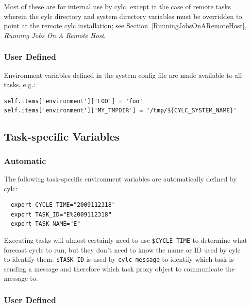 \documentclass[11pt,a4paper]{article}
\begin{document}
Most of these are for internal use by cylc, except in the case of remote
tasks wherein the cylc directory and system directory variables must be
overridden to point at the remote cylc installation; see
Section~\ref{RunningJobsOnARemoteHost}, {\em Running
Jobs On A Remote Host}. 

\subsubsection{User Defined}
\label{SystemWideVariables}

Environment variables defined in the system config file are made
available to all tasks, e.g.: 

\lstset{language=Python}

\begin{lstlisting}
self.items['environment']['FOO'] = 'foo'
self.items['environment']['MY_TMPDIR'] = '/tmp/${CYLC_SYSTEM_NAME}'
\end{lstlisting}


\subsection{Task-specific Variables}
\lstset{language=bash}

\subsubsection{Automatic}

The following task-specific environment variables are automatically
defined by cylc:

\begin{lstlisting}
  export CYCLE_TIME="2009112318"
  export TASK_ID="E%2009112318"
  export TASK_NAME="E"
\end{lstlisting}

Executing tasks will almost certainly need to use
\lstinline=$CYCLE_TIME= to determine what forecast cycle to run,
but they don't need to know the name or ID used by cylc to identify
them. \lstinline=$TASK_ID= is used by \lstinline=cylc message= to 
identify which task is sending a message and therefore which task proxy
object to communicate the message to.


\subsubsection{User Defined}
\label{TaskSpecificVariables}

\lstset{language=cylctaskdef}
\end{document}
